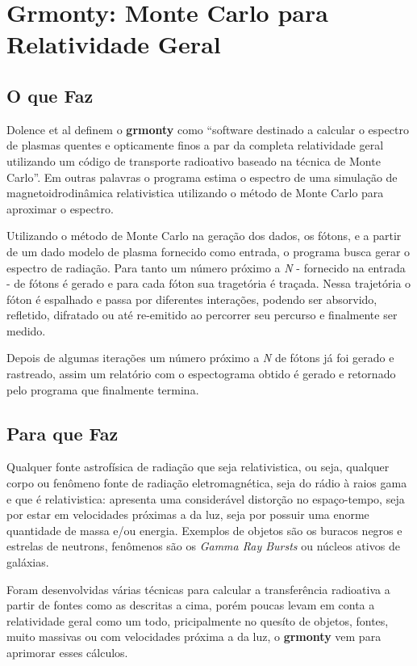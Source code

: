 \chapter{Grmonty: Monte Carlo para Relatividade Geral}
\label{cap:grmonty}

\section{O que Faz}
  Dolence et al definem o \textbf{grmonty} como ``software destinado a calcular o espectro de plasmas quentes e opticamente finos a par da completa relatividade geral utilizando um código de transporte radioativo baseado na técnica de Monte Carlo''\citep[p.1, traduzido]{Dolence:09}. Em outras palavras o programa estima o espectro de uma simulação de magnetoidrodinâmica relativistica utilizando o método de Monte Carlo para aproximar o espectro.

  Utilizando o método de Monte Carlo na geração dos dados, os fótons, e a partir de um dado modelo de plasma fornecido como entrada, o programa busca gerar o espectro de radiação. Para tanto um número próximo a \textit{N} - fornecido na entrada - de fótons é gerado e para cada fóton sua tragetória é traçada. Nessa trajetória o fóton é espalhado e passa por diferentes interações, podendo ser absorvido, refletido, difratado ou até re-emitido ao percorrer seu percurso e finalmente ser medido.

  Depois de algumas iterações um número próximo a \textit{N} de fótons já foi gerado e rastreado, assim um relatório com o espectograma obtido é gerado e retornado pelo programa que finalmente termina.

\section{Para que Faz}
  Qualquer fonte astrofísica de radiação que seja relativistica, ou seja, qualquer corpo ou fenômeno fonte de radiação eletromagnética, seja do rádio à raios gama e que é relativistica: apresenta uma considerável distorção no espaço-tempo, seja por estar em velocidades próximas a da luz, seja por possuir uma enorme quantidade de massa e/ou energia. Exemplos de objetos são os buracos negros e estrelas de neutrons, fenômenos são os \textit{Gamma Ray Bursts} ou núcleos ativos de galáxias.

  Foram desenvolvidas várias técnicas para calcular a transferência radioativa a partir de fontes como as descritas a cima\citep{Dolence:09}, porém poucas levam em conta a relatividade geral como um todo, pricipalmente no quesíto de objetos, fontes, muito massivas ou com velocidades próxima a da luz, o \textbf{grmonty} vem para aprimorar esses cálculos.

